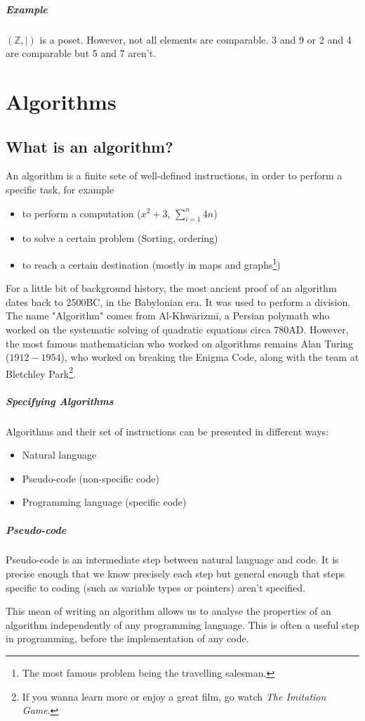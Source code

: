 \documentclass[10pt,a4paper]{book}
\begin{document}
\paragraph*{Example}
$(\mathbb{Z},|)$ is a poset. However, not all elements are comparable. 3 and 9 or 2 and 4 are comparable but 5 and 7 aren't.

\chapter{Algorithms}

\section{What is an algorithm?}
An algorithm is a finite sete of well-defined instructions, in order to perform a specific task, for example
\begin{itemize}
\item to perform a computation ($x^2 + 3$, $\sum_{i=1}^{n} 4n$)
\item to solve a certain problem (Sorting, ordering)
\item to reach a certain destination (mostly in maps and graphs\footnote{The most famous problem being the travelling salesman.})
\end{itemize}
For a little bit of background history, the most ancient proof of an algorithm dates back to 2500BC, in the Babylonian era. It was used to perform a division. The name "Algorithm" comes from Al-Khwārizmī, a Persian polymath who worked on the systematic solving of quadratic equations circa 780AD. However, the most famous mathematician who worked on algorithms remains Alan Turing ($1912-1954$), who worked on breaking the Enigma Code, along with the team at Bletchley Park\footnote{If you wanna learn more or enjoy a great film, go watch \textit{The Imitation Game}.}.
\paragraph*{Specifying Algorithms}
Algorithms and their set of instructions can be presented in different ways:
\begin{itemize}
\item Natural language
\item Pseudo-code (non-specific code)
\item Programming language (specific code)
\end{itemize}
\paragraph*{Pseudo-code}
Pseudo-code is an intermediate step between natural language and code. It is precise enough that we know precisely each step but general enough that steps specific to coding (such as variable types or pointers) aren't specified.\par
This mean of writing an algorithm allows us to analyse the properties of an algorithm independently of any programming language. This is often a useful step in programming, before the implementation of any code.
\end{document}
